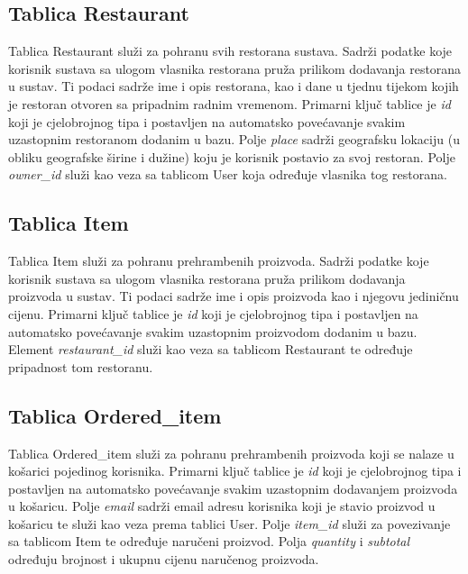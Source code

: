 \documentclass[times, utf8, zavrsni, numeric]{fer}
\begin{document}
\subsection{Tablica Restaurant}
Tablica Restaurant služi za pohranu svih restorana sustava. Sadrži podatke koje korisnik sustava sa ulogom vlasnika restorana pruža prilikom dodavanja restorana u sustav. Ti podaci sadrže ime i opis restorana, kao i dane u tjednu tijekom kojih je restoran otvoren sa pripadnim radnim vremenom. Primarni ključ tablice je \emph{id} koji je cjelobrojnog tipa i postavljen na automatsko povećavanje svakim uzastopnim restoranom dodanim u bazu. Polje \emph{place} sadrži geografsku lokaciju (u obliku geografske širine i dužine) koju je korisnik postavio za svoj restoran. Polje \emph{owner\_id} služi kao veza sa tablicom User koja određuje vlasnika tog restorana.
\subsection{Tablica Item}
Tablica Item služi za pohranu prehrambenih proizvoda. Sadrži podatke koje korisnik sustava sa ulogom vlasnika restorana pruža prilikom dodavanja proizvoda u sustav. Ti podaci sadrže ime i opis proizvoda kao i njegovu jediničnu cijenu. Primarni ključ tablice je \emph{id} koji je cjelobrojnog tipa i postavljen na automatsko povećavanje svakim uzastopnim proizvodom dodanim u bazu. Element \emph{restaurant\_id} služi kao veza sa tablicom Restaurant te određuje pripadnost tom restoranu.
\subsection{Tablica Ordered\_item}
Tablica Ordered\_item služi za pohranu prehrambenih proizvoda koji se nalaze u košarici pojedinog korisnika. Primarni ključ tablice je \emph{id} koji je cjelobrojnog tipa i postavljen na automatsko povećavanje svakim uzastopnim dodavanjem proizvoda u košaricu. Polje \emph{email} sadrži email adresu korisnika koji je stavio proizvod u košaricu te služi kao veza prema tablici User. Polje \emph{item\_id} služi za povezivanje sa tablicom Item te određuje naručeni proizvod. Polja \emph{quantity} i \emph{subtotal} određuju brojnost i ukupnu cijenu naručenog proizvoda.
\end{document}
